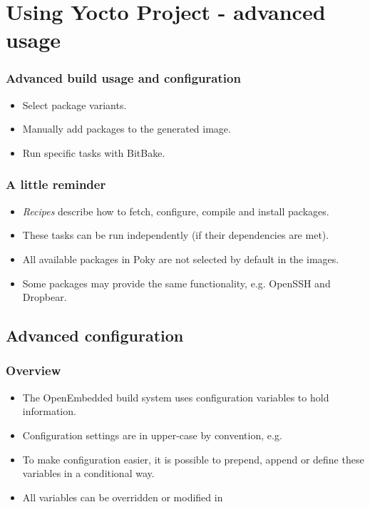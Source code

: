 \section{Using Yocto Project - advanced usage}

\begin{frame}
  \frametitle{Advanced build usage and configuration}
  \begin{itemize}
    \item Select package variants.
    \item Manually add packages to the generated image.
    \item Run specific tasks with BitBake.
  \end{itemize}
\end{frame}

\begin{frame}
  \frametitle{A little reminder}
  \begin{itemize}
    \item {\em Recipes} describe how to fetch, configure, compile and
      install packages.
    \item These tasks can be run independently (if their dependencies
      are met).
    \item All available packages in Poky are not selected by default
      in the images.
    \item Some packages may provide the same functionality, e.g.
      OpenSSH and Dropbear.
  \end{itemize}
\end{frame}

\subsection{Advanced configuration}

\begin{frame}
  \frametitle{Overview}
  \begin{itemize}
    \item The OpenEmbedded build system uses configuration variables
      to hold information.
    \item Configuration settings are in upper-case by convention, e.g.
    \item To make configuration easier, it is possible to prepend,
      append or define these variables in a conditional way.
    \item All variables can be overridden or modified in
  \end{itemize}
\end{frame}

